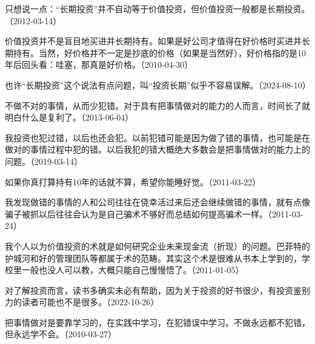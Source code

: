 
只想说一点：“长期投资”并不自动等于价值投资，但价值投资一般都是长期投资。（2012-03-14）

价值投资并不是盲目地买进并长期持有。如果是好公司才值得在好价格时买进并长期持有。当然，好价格并不一定是抄底的价格（如果是当然好），好价格指的是10年后回头看：哇塞，那真是好价格。（2010-04-30）

也许“长期投资”这个说法有点问题，叫“投资长期”似乎不容易误解。（2024-08-10）


不做不对的事情，从而少犯错。对于具有把事情做对的能力的人而言，时间长了就明白什么是复利了。（2013-06-04）


我投资也犯过错，以后也还会犯。以前犯错可能是因为做了错的事情，也可能是在做对的事情过程中犯的错。以后我犯的错大概绝大多数会是把事情做对的能力上的问题。（2019-03-14）


如果你真打算持有10年的话就不算，希望你能睡好觉。（2011-03-22）


我发现做错的事情的人和公司往往在侥幸活过来后还会继续做错的事情，就有点像骗子被抓以后往往会认为是自己骗术不够好而总结如何提高骗术一样。（2011-03-24）


我个人以为价值投资的术就是如何研究企业未来现金流（折现）的问题。巴菲特的护城河和好的管理团队等都属于术的范畴。其实这个术是很难从书本上学到的，学校里一般也没人可以教，大概只能自己慢慢悟了。（2011-01-05）

对了解投资而言，读书多确实未必有帮助，因为关于投资的好书很少，有投资鉴别力的读者可能也不是很多。（2022-10-26）


把事情做对是要靠学习的，在实践中学习，在犯错误中学习。不做永远都不犯错，但永远学不会。（2010-03-27）

